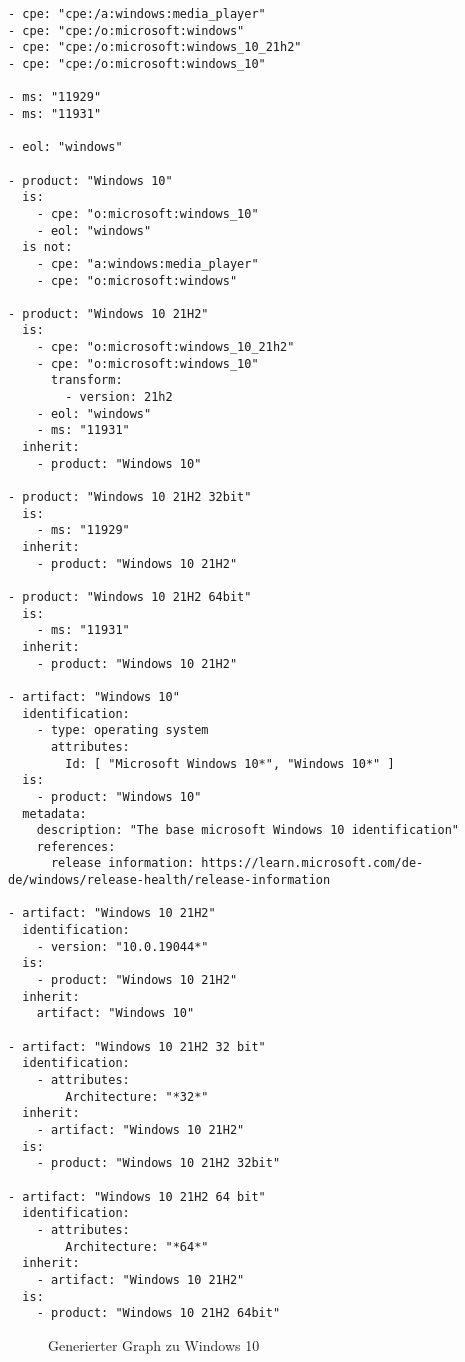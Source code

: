\begin{lstlisting}[style=yaml,caption={Produktmodellierung zu Windows 10},label={lst:new-correlation-windows-10},basicstyle=\ttfamily\scriptsize]
- cpe: "cpe:/a:windows:media_player"
- cpe: "cpe:/o:microsoft:windows"
- cpe: "cpe:/o:microsoft:windows_10_21h2"
- cpe: "cpe:/o:microsoft:windows_10"

- ms: "11929"
- ms: "11931"

- eol: "windows"

- product: "Windows 10"
  is:
    - cpe: "o:microsoft:windows_10"
    - eol: "windows"
  is not:
    - cpe: "a:windows:media_player"
    - cpe: "o:microsoft:windows"

- product: "Windows 10 21H2"
  is:
    - cpe: "o:microsoft:windows_10_21h2"
    - cpe: "o:microsoft:windows_10"
      transform:
        - version: 21h2
    - eol: "windows"
    - ms: "11931"
  inherit:
    - product: "Windows 10"

- product: "Windows 10 21H2 32bit"
  is:
    - ms: "11929"
  inherit:
    - product: "Windows 10 21H2"

- product: "Windows 10 21H2 64bit"
  is:
    - ms: "11931"
  inherit:
    - product: "Windows 10 21H2"

- artifact: "Windows 10"
  identification:
    - type: operating system
      attributes:
        Id: [ "Microsoft Windows 10*", "Windows 10*" ]
  is:
    - product: "Windows 10"
  metadata:
    description: "The base microsoft Windows 10 identification"
    references:
      release information: https://learn.microsoft.com/de-de/windows/release-health/release-information

- artifact: "Windows 10 21H2"
  identification:
    - version: "10.0.19044*"
  is:
    - product: "Windows 10 21H2"
  inherit:
    artifact: "Windows 10"

- artifact: "Windows 10 21H2 32 bit"
  identification:
    - attributes:
        Architecture: "*32*"
  inherit:
    - artifact: "Windows 10 21H2"
  is:
    - product: "Windows 10 21H2 32bit"

- artifact: "Windows 10 21H2 64 bit"
  identification:
    - attributes:
        Architecture: "*64*"
  inherit:
    - artifact: "Windows 10 21H2"
  is:
    - product: "Windows 10 21H2 64bit"
\end{lstlisting}

\begin{figure}[htbp]
    \centering
    \makebox[\textwidth]{}
    \caption{Generierter Graph zu Windows 10}
    \label{fig:example-graph-windows-10}
\end{figure}
